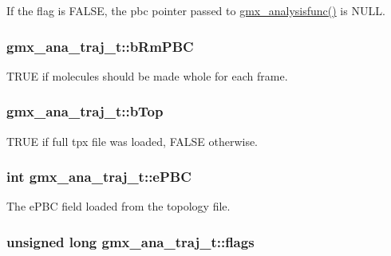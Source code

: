 \-If the flag is \-F\-A\-L\-S\-E, the {\ttfamily pbc} pointer passed to \hyperlink{include_2trajana_8h_ae359015d9f5e49a31d5f4fd113bf7a3d}{gmx\-\_\-analysisfunc()} is \-N\-U\-L\-L. \hypertarget{structgmx__ana__traj__t_ac86fe68b49a69a04c634dc01129254f2}{
\subsubsection[{b\-Rm\-P\-B\-C}]{ {\bf gmx\-\_\-ana\-\_\-traj\-\_\-t\-::b\-Rm\-P\-B\-C}}}\label{structgmx__ana__traj__t_ac86fe68b49a69a04c634dc01129254f2}
\-T\-R\-U\-E if molecules should be made whole for each frame. \hypertarget{structgmx__ana__traj__t_aa53d89f68f5be475433ab4a3c6a3b548}{
\subsubsection[{b\-Top}]{ {\bf gmx\-\_\-ana\-\_\-traj\-\_\-t\-::b\-Top}}}\label{structgmx__ana__traj__t_aa53d89f68f5be475433ab4a3c6a3b548}
\-T\-R\-U\-E if full tpx file was loaded, \-F\-A\-L\-S\-E otherwise. \hypertarget{structgmx__ana__traj__t_ac41bbb36db7d48726cc82a6ce6a305b4}{
\subsubsection[{e\-P\-B\-C}]{\setlength{\rightskip}{0pt plus 5cm}int {\bf gmx\-\_\-ana\-\_\-traj\-\_\-t\-::e\-P\-B\-C}}}\label{structgmx__ana__traj__t_ac41bbb36db7d48726cc82a6ce6a305b4}
\-The e\-P\-B\-C field loaded from the topology file. \hypertarget{structgmx__ana__traj__t_a68db89f34ec8fb3478326298e6b837dd}{
\subsubsection[{flags}]{\setlength{\rightskip}{0pt plus 5cm}unsigned long {\bf gmx\-\_\-ana\-\_\-traj\-\_\-t\-::flags}}}\label{structgmx__ana__traj__t_a68db89f34ec8fb3478326298e6b837dd}


